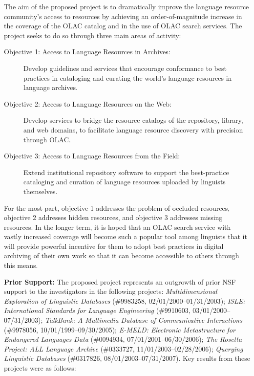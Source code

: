 
The aim of the proposed project is to dramatically improve the language
resource community's access to resources by achieving an 
order-of-magnitude increase in the coverage of the OLAC catalog
and in the use of OLAC search services.
The project seeks to do so through three main areas of activity:

\begin{description}
  \item[Objective 1: Access to Language Resources in Archives:]
    Develop guidelines and services that encourage conformance to best
    practices in cataloging and curating the world's language resources
    in language archives.

  \item[Objective 2: Access to Language Resources on the Web:]
    Develop services to bridge the resource catalogs of the
    repository, library, and web domains,
    to facilitate language resource discovery with precision through OLAC.

  \item[Objective 3: Access to Language Resources from the Field:]
    Extend institutional repository software to support the
    best-practice cataloging and curation of language resources
    uploaded by linguists themselves.
\end{description}

For the most part, objective 1 addresses the problem of occluded resources,
objective 2 addresses hidden resources, and objective 3 addresses missing resources.
In the longer term, it is hoped that an OLAC search
service with vastly increased coverage will become such a popular tool
among linguists that it will provide powerful incentive for them to
adopt best practices in digital archiving of their own work so that it
can become accessible to others through this means. 

\textbf{Prior Support:} The proposed project represents an outgrowth of
prior NSF support to the investigators in the following projects:
\textit{Multidimensional Exploration of Linguistic Databases}
  ({\small \#9983258, 02/01/2000--01/31/2003});
\textit{ISLE: International Standards for Language Engineering}
  ({\small \#9910603, 03/01/2000--07/31/2003});
\textit{TalkBank: A Multimedia Database of Communicative Interactions}
  ({\small \#9978056, 10/01/1999--09/30/2005});
\textit{E-MELD: Electronic Metastructure for Endangered Languages Data}
  ({\small \#0094934, 07/01/2001--06/30/2006});
\textit{The Rosetta Project: ALL Language Archive}
  ({\small \#0333727, 11/01/2003--02/28/2006});
\textit{Querying Linguistic Databases}
  ({\small \#0317826, 08/01/2003--07/31/2007}).
Key results from these projects were as follows:

